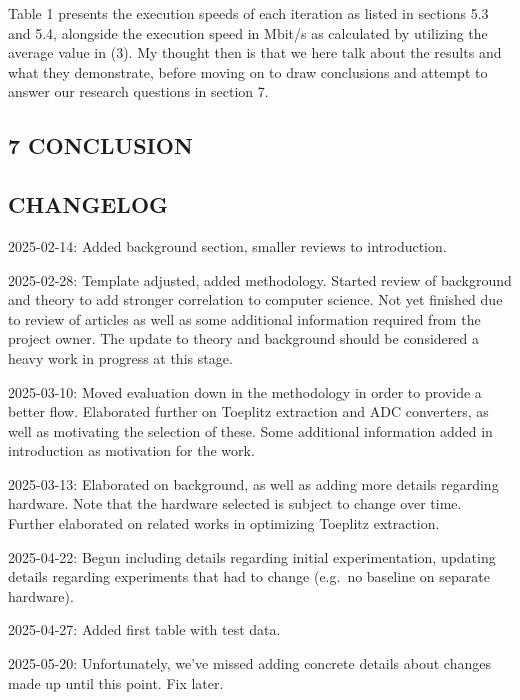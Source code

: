 \documentclass{sigchi}
\begin{document}
Table 1 presents the execution speeds of each iteration as listed in sections 5.3 and 5.4, alongside the execution speed in Mbit/s as calculated by utilizing the average value in (3). My thought then is that we here talk about the results and what they demonstrate, before moving on to draw conclusions and attempt to answer our research questions in section 7.

\subsection{7 CONCLUSION}\label{conclusion}

\subsection{CHANGELOG}\label{changelog}

2025-02-14: Added background section, smaller reviews to introduction.

2025-02-28: Template adjusted, added methodology. Started review of background and theory to add stronger correlation to computer science. Not yet finished due to review of articles as well as some additional information required from the project owner. The update to theory and background should be considered a heavy work in progress at this stage.

2025-03-10: Moved evaluation down in the methodology in order to provide a better flow. Elaborated further on Toeplitz extraction and ADC converters, as well as motivating the selection of these. Some additional information added in introduction as motivation for the work.

2025-03-13: Elaborated on background, as well as adding more details regarding hardware. Note that the hardware selected is subject to change over time. Further elaborated on related works in optimizing Toeplitz extraction.

2025-04-22: Begun including details regarding initial experimentation, updating details regarding experiments that had to change (e.g.~no baseline on separate hardware).

2025-04-27: Added first table with test data.

2025-05-20: Unfortunately, we've missed adding concrete details about changes made up until this point. Fix later.
\balance{}



\end{document}
